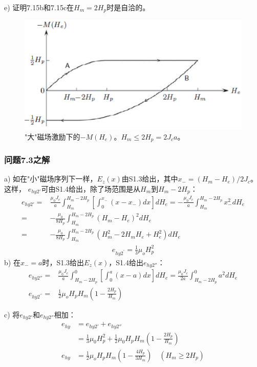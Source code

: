 e) 证明7.15b和7.15c在$H_m=2H_p$时是自洽的。

\begin{figure}[htbp]
	\centering
	\includegraphics[scale=0.7]{chpt7/figs/fig7.12.eps}
	\caption{"大"磁场激励下的$-M(H_e)$。$H_m\le 2H_p=2J_c a$。}
\end{figure}

\subsubsection{问题7.3之解}
a) 如在"小"磁场序列下一样，$E_z(x)$由S1.3给出，其中$x_-=(H_m-H_e)/2J_c$。这样，
$e_{hy2'}$可由S1.4给出，除了场范围是从$H_m$到$H_m-2H_p$：
\begin{align*}%
e_{hy2'}=&\frac{\mu_0 J_c}{a}\int_{H_m}^{H_m-2H_p}\left[\int_{0}^{x_-}(x-x_-)dx\right]dH_e=-\frac{\mu_0 J_c}{a}\int_{H_m}^{H_m-2H_p} x_-^2 dH_e\\
=&-\frac{\mu_0}{8H_p}\int_{H_m}^{H_m-2H_p}(H_m-H_e)^2 dH_e\\
=&-\frac{\mu_0}{8H_p}\int_{H_m}^{H_m-2H_p}(H_m^2-2H_mH_e+H_e^2) dH_e
\end{align*}
\begin{align*}
e_{hy2^\prime}=\frac{1}{3}\mu_oH_{p}^{2} \tag{7.16a}
\end{align*}
b) 在$x_-=a$时，S1.3给出$E_z(x)$，S1.4给出$e_{hy2''}$：
\begin{align*}%
e_{hy2''}=&\frac{\mu_0 J_c}{a}\int_{H_m-2H_p}^{0}\left[\int_{0}^{a}(x-a)dx\right]dH_e=\frac{\mu_0J_c}{2a}\int_{H_m-2H_p}^{0}a^2 dH_e\\
e_{hy2^{\prime\prime}}=&\frac{1}{2}\mu_oH_pH_m\left(1-\frac{2H_p}{H_m}\right) \tag{7.16b}
\end{align*}

c) 将$e_{hy2'}$和$e_{hy2''}$相加：
\begin{align*}%
e_{hy}&=e_{hy2'}+e_{hy2''}\\
&=\frac{1}{3}\mu_0 H_p^2 +\frac{1}{2}\mu_0H_p H_m\left(1-\frac{2H_p}{H_m}\right)\\
e_{hy}&=\frac{1}{2}\mu_oH_pH_m\left(1-\frac{4H_p}{3H_m}\right)  \quad   (H_m\geq 2H_p) \tag{7.14b}
\end{align*}

